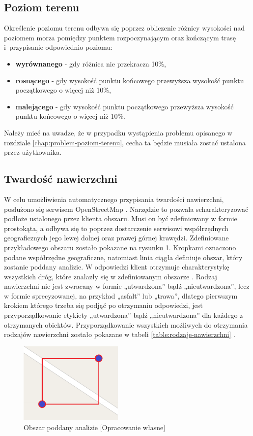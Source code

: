 \subsection{Poziom terenu}
Określenie poziomu terenu odbywa się poprzez obliczenie różnicy wysokości nad poziomem morza pomiędzy punktem rozpoczynającym oraz kończącym trasę i~przypisanie odpowiednio poziomu:
\begin{itemize}
\item{\textbf{wyrównanego}} - gdy różnica nie przekracza 10\%,
\item{\textbf{rosnącego}} - gdy wysokość punktu końcowego przewyższa wysokość punktu początkowego o więcej niż 10\%,
\item{\textbf{malejącego}} - gdy wysokość punktu początkowego przewyższa wysokość punktu końcowego o więcej niż 10\%.
\end {itemize}
Należy mieć na uwadze, że w przypadku wystąpienia problemu opisanego w rozdziale \ref{chap:problem-poziom-terenu}, cecha ta będzie musiała zostać ustalona przez użytkownika.

\subsection{Twardość nawierzchni}\label{chapter:wyznaczenie-twardosc}
W celu umożliwienia automatycznego przypisania twardości nawierzchni, posłużono się serwisem OpenStreetMap \cite{osm}. Narzędzie to pozwala scharakteryzować podłoże ustalonego przez klienta obszaru. Musi on być zdefiniowany w formie prostokąta, a odbywa się to poprzez dostarczenie serwisowi współrzędnych geograficznych jego lewej dolnej oraz prawej górnej krawędzi. Zdefiniowane przykładowego obszaru zostało pokazane na rysunku \ref{image:mapka_obszar}. Kropkami oznaczono podane współrzędne geograficzne, natomiast linia ciągła definiuje obszar, który zostanie poddany analizie. W odpowiedzi klient otrzymuje charakterystykę wszystkich dróg, które znalazły się w zdefiniowanym obszarze \cite{osm-docs-wiki}. Rodzaj nawierzchni nie jest zwracany w formie „utwardzona” bądź „nieutwardzona”, lecz w formie sprecyzowanej, na przykład „asfalt” lub „trawa”, dlatego pierwszym krokiem którego trzeba się podjąć po otrzymaniu odpowiedzi, jest przyporządkowanie etykiety  „utwardzona” bądź „nieutwardzona” dla każdego z otrzymanych obiektów. Przyporządkowanie wszystkich możliwych do otrzymania rodzajów nawierzchni zostało pokazane w tabeli \ref{table:rodzaje-nawierzchni} \cite{osm-surface}.

\begin{figure}[h]\label{fig:miary}
\begin{center}
\includegraphics[width=2in]{img/mapka_obszar.png}
\caption{Obszar poddany analizie [Opracowanie własne]}\label{image:mapka_obszar}
\end{center}
\end{figure}

